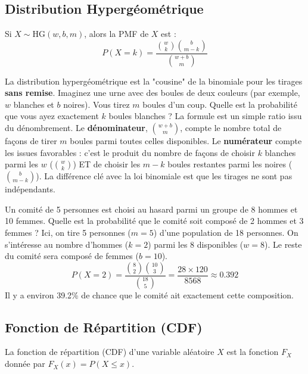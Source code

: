 \subsection{Distribution Hypergéométrique}

\begin{theorembox}
Si $X \sim \text{HG}(w, b, m)$, alors la PMF de $X$ est :
$$ P(X=k) = \frac{\binom{w}{k} \binom{b}{m-k}}{\binom{w+b}{m}} $$
\end{theorembox}

\begin{intuitionbox}
La distribution hypergéométrique est la "cousine" de la binomiale pour les tirages \textbf{sans remise}. Imaginez une urne avec des boules de deux couleurs (par exemple, $w$ blanches et $b$ noires). Vous tirez $m$ boules d'un coup. Quelle est la probabilité que vous ayez exactement $k$ boules blanches ?
La formule est un simple ratio issu du dénombrement. Le \textbf{dénominateur}, $\binom{w+b}{m}$, compte le nombre total de façons de tirer $m$ boules parmi toutes celles disponibles. Le \textbf{numérateur} compte les issues favorables : c'est le produit du nombre de façons de choisir $k$ blanches parmi les $w$ ($\binom{w}{k}$) ET de choisir les $m-k$ boules restantes parmi les noires ($\binom{b}{m-k}$). La différence clé avec la loi binomiale est que les tirages ne sont pas indépendants.
\end{intuitionbox}

\begin{examplebox}
Un comité de 5 personnes est choisi au hasard parmi un groupe de 8 hommes et 10 femmes. Quelle est la probabilité que le comité soit composé de 2 hommes et 3 femmes ?
Ici, on tire 5 personnes ($m=5$) d'une population de 18 personnes. On s'intéresse au nombre d'hommes ($k=2$) parmi les 8 disponibles ($w=8$). Le reste du comité sera composé de femmes ($b=10$).
$$ P(X=2) = \frac{\binom{8}{2} \binom{10}{3}}{\binom{18}{5}} = \frac{28 \times 120}{8568} \approx 0.392 $$
Il y a environ 39.2\% de chance que le comité ait exactement cette composition.
\end{examplebox}

\subsection{Fonction de Répartition (CDF)}

\begin{definitionbox}
La fonction de répartition (CDF) d'une variable aléatoire $X$ est la fonction $F_X$ donnée par $F_X(x) = P(X \le x)$.
\end{definitionbox}

